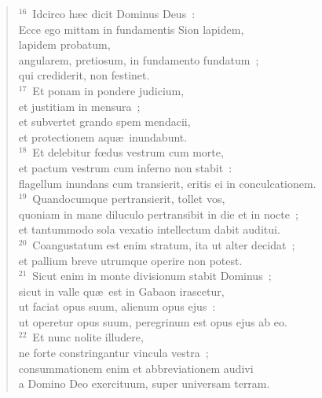 \begin{flushleft}
\begin{verse}
${}^{16}$~Idcirco h\ae c dicit Dominus Deus~:\\ Ecce ego mittam in fundamentis Sion lapidem,\\ lapidem probatum,\\ angularem, pretiosum, in fundamento fundatum~;\\ qui crediderit, non festinet.\\
${}^{17}$~Et ponam in pondere judicium,\\ et justitiam in mensura~;\\ et subvertet grando spem mendacii,\\ et protectionem aqu\ae\ inundabunt.\\
${}^{18}$~Et delebitur fœdus vestrum cum morte,\\ et pactum vestrum cum inferno non stabit~:\\ flagellum inundans cum transierit, eritis ei in conculcationem.\\
${}^{19}$~Quandocumque pertransierit, tollet vos,\\ quoniam in mane diluculo pertransibit in die et in nocte~;\\ et tantummodo sola vexatio intellectum dabit auditui.\\
${}^{20}$~Coangustatum est enim stratum, ita ut alter decidat~;\\ et pallium breve utrumque operire non potest.\\
${}^{21}$~Sicut enim in monte divisionum stabit Dominus~;\\ sicut in valle qu\ae\ est in Gabaon irascetur,\\ ut faciat opus suum, alienum opus ejus~:\\ ut operetur opus suum, peregrinum est opus ejus ab eo.\\
${}^{22}$~Et nunc nolite illudere,\\ ne forte constringantur vincula vestra~;\\ consummationem enim et abbreviationem audivi\\ a Domino Deo exercituum, super universam terram.\end{verse}\end{flushleft}


